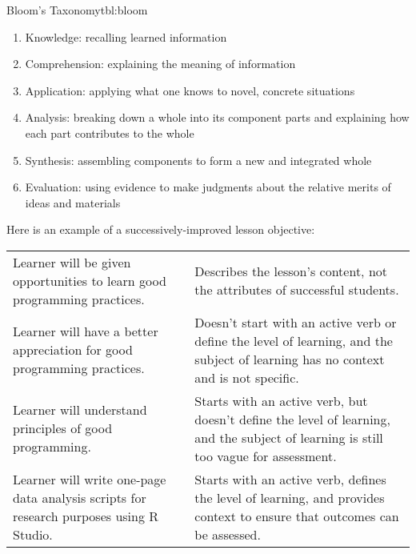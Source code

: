 \begin{tbllbl}{Bloom's Taxonomy}{tbl:bloom}

\begin{enumerate}

\item Knowledge: recalling learned information

\item Comprehension: explaining the meaning of information

\item Application: applying what one knows to novel, concrete situations

\item Analysis: breaking down a whole into its component parts and explaining how each part contributes to the whole

\item Synthesis: assembling components to form a new and integrated whole

\item Evaluation: using evidence to make judgments about the relative merits of ideas and materials

\end{enumerate}

\end{tbllbl}

Here is an example of a successively-improved lesson objective:

\begin{tabular}{ll}

Learner will be given opportunities to learn good programming practices.
&
Describes the lesson's content, not the attributes of successful students.
\\

Learner will have a better appreciation for good programming practices.
&
Doesn't start with an active verb or define the level of learning,
and the subject of learning has no context and is not specific.
\\

Learner will understand principles of good programming.
&
Starts with an active verb, but doesn't define the level of learning,
and the subject of learning is still too vague for assessment.
\\

Learner will write one-page data analysis scripts for research purposes using R Studio.
&
Starts with an active verb, defines the level of learning,
and provides context to ensure that outcomes can be assessed.
\\

\end{tabular}

